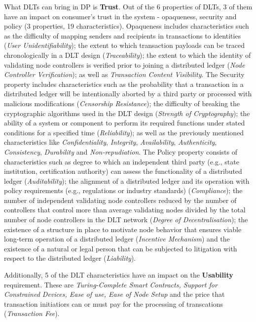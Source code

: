 What DLTs can bring in DP is \textbf{Trust}. Out of the 6 properties of DLTs, 3 of them have an impact on consumer's trust in the system - opaqueness, security and policy (3 properties, 19 characteristics). Opaqueness includes characteristics such as the difficulty of mapping senders and recipients in transactions to identities (\textit{User Unidentifiability}); the extent to which transaction payloads can be traced chronologically in a DLT design (\textit{Traceability}); the extent to which the identity of validating node controllers is verified prior to joining a distributed ledger (\textit{Node Controller Verification}); as well as \textit{Transaction Content Visibility}. The Security property includes characteristics such as the probability that a transaction in a distributed ledger will be intentionally aborted by a third party or processed with malicious modifications (\textit{Censorship Resistance}); the difficulty of breaking the cryptographic algorithms used in the DLT design (\textit{Strength of Cryptography}); the ability of a system or component to perform its required functions under stated conditions for a specified time (\textit{Reliability}); as well as the previously mentioned characteristics like \textit{Confidentiality}, \textit{Integrity}, \textit{Availability}, \textit{Authenticity}, \textit{Consistency}, \textit{Durability} and \textit{Non-repudiation}. The Policy property consists of characteristics such as degree to which an independent third party (e.g., state institution, certification authority) can assess the functionality of a distributed ledger (\textit{Auditability}); the alignment of a distributed ledger and its operation with policy requirements (e.g., regulations or industry standards) (\textit{Compliance}); the number of independent validating node controllers reduced by the number of controllers that control more than average validating nodes divided by the total number of node controllers in the DLT network (\textit{Degree of Decentralisation}); the existence of a structure in place to motivate node behavior that ensures viable long-term operation of a distributed ledger (\textit{Incentive Mechanism}) and the existence of a natural or legal person that can be subjected to litigation with respect to the distributed ledger (\textit{Liability}).

Additionally, 5 of the DLT characteristics have an impact on the \textbf{Usability} requirement. These are \textit{Turing-Complete Smart Contracts, Support for Constrained Devices, Ease of use, Ease of Node Setup} and the price that transaction initiatiors can or must pay for the processing of transcations (\textit{Transaction Fee}).


